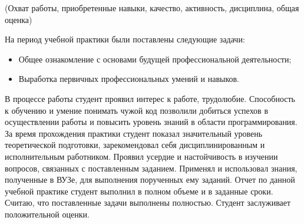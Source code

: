 \begin{center}
    \footnotesize{(Охват работы, приобретенные навыки, качество, активность, дисциплина, общая оценка)}
\end{center}\bigbreak

На период учебной практики были поставлены следующие задачи:
\begin{itemize}
    \item Общее ознакомление с основами будущей профессиональной деятельности;
    \item Выработка первичных профессиональных умений и навыков.
\end{itemize}
В процессе работы студент проявил интерес к работе, трудолюбие.\bigbreak
Способность к обучению и умение понимать чужой код позволили добиться успехов в осуществлении 
работы и повысить уровень знаний в области программирования. За время прохождения практики студент 
показал значительный уровень теоретической подготовки, зарекомендовал себя дисциплинированным и исполнительным 
работником. Проявил усердие и настойчивость в изучении вопросов, связанных с поставленным заданием. Применял 
и использовал знания, полученные в ВУЗе, для выполнения порученных ему заданий.\bigbreak
Отчет по данной учебной практике студент выполнил в полном объеме и в заданные сроки.\bigbreak
Считаю, что поставленные задачи выполнены полностью. Студент заслуживает положительной оценки.
